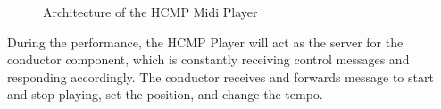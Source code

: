 \begin{figure}[H]
\caption{Architecture of the HCMP Midi Player}
\label{fig:speciation}
\end{figure}

During the performance, the HCMP Player will act as 
the server for the conductor component, which is constantly 
receiving control messages and responding accordingly. The
conductor receives and forwards message to start and stop playing,
set the position, and change the tempo.












